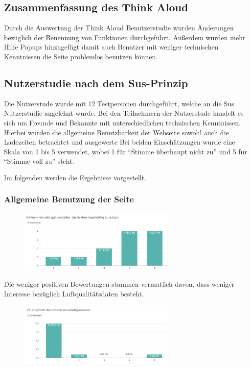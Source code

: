 \subsection{Zusammenfassung des Think Aloud}
Durch die Auswertung der Think Aloud Benutzerstudie wurden Änderungen bezüglich der Benennung von Funktionen durchgeführt. Außerdem wurden mehr Hilfe Popups hinzugefügt damit auch Benutzer mit weniger
technischen Kenntnissen die Seite problemlos benutzen können.

\subsection{Nutzerstudie nach dem Sus-Prinzip}
Die Nutzerstude wurde mit 12 Testpersonen durchgeführt, welche an die Sus Nutzerstudie angelehnt wurde. 
Bei den Teilnehmern der Nutzerstude handelt es sich um Freunde und Bekannte mit unterschiedlichen technischen Kenntnissen. 
Hierbei wurden die allgemeine Benutzbarkeit der Webseite sowohl auch die Ladezeiten betrachtet und ausgewerte
Bei beiden Einschätzungen wurde eine Skala von 1 bis 5 verwendet, wobei 1 für \enquote{Stimme überhaupt nicht zu} und 5 für \enquote{Stimme voll zu} steht.

Im folgenden werden die Ergebnisse vorgestellt.
\subsubsection{Allgemeine Benutzung der Seite}
\begin{figure}[H]
    \centering
    \includegraphics[width=0.7\textwidth]{media/survey/regularUsage.png}
\end{figure}
Die weniger positiven Bewertungen stammen vermutlich davon, dass weniger Interesse bezüglich Luftqualitätsdaten besteht.

\begin{figure}[H]
    \centering
    \includegraphics[width=0.7\textwidth]{media/survey/complexity.png}
\end{figure}

